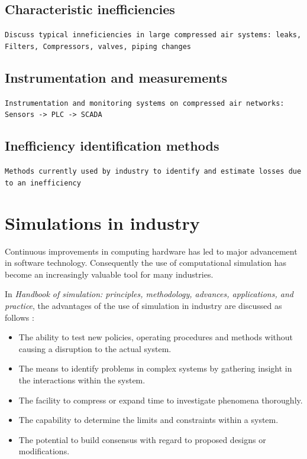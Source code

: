	\subsection{Characteristic inefficiencies}
	\texttt{Discuss typical inneficiencies in large  compressed air systems: leaks, Filters, Compressors, valves, piping changes}
	\subsection{Instrumentation and measurements}
	\texttt{Instrumentation and monitoring systems on compressed air networks: Sensors -> PLC -> SCADA}
	\subsection{Inefficiency identification methods}
	\texttt{Methods currently used by industry to identify and estimate losses due to an inefficiency}
	
	
\section{Simulations in industry}

Continuous improvements in computing hardware has led to major advancement in software technology. Consequently the use of computational simulation has become an increasingly valuable tool for many industries.\cite{kocsis2003integration} \par 

 In \textit{ Handbook of simulation: principles, methodology, advances, applications, and practice}, the advantages of the use of simulation in industry are discussed as follows \cite{banks1998handbook}: 
\begin{itemize}
	\item The ability to test new policies, operating procedures and methods without causing a disruption to the actual system.
	\item The means to identify problems in complex systems by gathering insight in the interactions within the system.
	\item The facility to compress or expand time to investigate phenomena thoroughly.
	\item The capability to determine the limits and constraints within a system.
	\item The potential to build consensus with regard to proposed designs or modifications.
\end{itemize}

